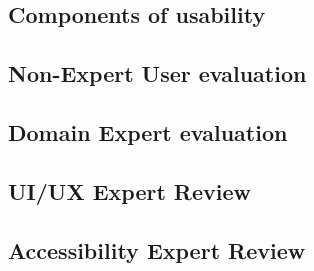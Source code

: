 \documentclass[preview]{standalone}
\begin{document}
\subsection{Components of usability}


\subsection{Non-Expert User evaluation}


\newpage
\subsection{Domain Expert evaluation}


\newpage
\subsection{UI/UX Expert Review}


\subsection{Accessibility Expert Review}

\end{document}
